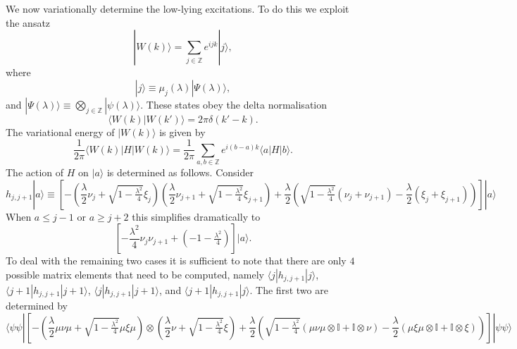 \documentclass[prl,twocolumn,lengthcheck,superscriptaddress]{revtex4-1}
\theoremstyle{definition}
\theoremstyle{remark}
\begin{document}
We now variationally determine the low-lying excitations. To do this we exploit the ansatz
\begin{equation}
	|W(k)\rangle = \sum_{j\in\mathbb{Z}} e^{ijk} |j\rangle,
\end{equation}
where
\begin{equation}
	|j\rangle \equiv \mu_j(\lambda) |\Psi(\lambda)\rangle,
\end{equation}
and $|\Psi(\lambda)\rangle \equiv \bigotimes_{j\in\mathbb{Z}} |\psi(\lambda)\rangle$.  These states obey the delta normalisation
\begin{equation}
	\langle W(k)|W(k')\rangle = 2\pi\delta(k'-k).
\end{equation}
The variational energy of $|W(k)\rangle$ is given by
\begin{equation}
	\frac{1}{2\pi}\langle W(k)|H|W(k)\rangle = \frac{1}{2\pi}\sum_{a,b\in\mathbb{Z}} e^{i(b-a)k} \langle a| H|b\rangle.
\end{equation}
The action of $H$ on $|a\rangle$ is determined as follows. Consider
\begin{equation}
	h_{j,j+1}|a\rangle \equiv \left[-\left(\frac{\lambda}{2}\nu_j +  \sqrt{1-\tfrac{\lambda^2}{4}}\xi_j\right)\left(\frac{\lambda}{2}\nu_{j+1} +  \sqrt{1-\tfrac{\lambda^2}{4}}\xi_{j+1}\right) + \frac{\lambda}{2}\left( \sqrt{1-\tfrac{\lambda^2}{4}}(\nu_j+\nu_{j+1}) -  \frac{\lambda}{2}( \xi_j+\xi_{j+1})\right)\right] |a\rangle
\end{equation}
When $a \le j-1$ or $a\ge j+2$ this simplifies dramatically to
\begin{equation}
	\left[-\frac{\lambda^2}{4}\nu_j\nu_{j+1} + \left(-1-\tfrac{\lambda^2}{4}\right)\right] |a\rangle.
\end{equation}
To deal with the remaining two cases it is sufficient to note that there are only $4$ possible matrix elements that need to be computed, namely $\langle j|h_{j,j+1}|j\rangle$, $\langle j+1|h_{j,j+1}|j+1\rangle$, $\langle j|h_{j,j+1}|j+1\rangle$, and $\langle j+1|h_{j,j+1}|j\rangle$. The first two are determined by
\begin{equation}
	\langle \psi\psi|\left[-\left(\frac{\lambda}{2}\mu\nu\mu +  \sqrt{1-\tfrac{\lambda^2}{4}}\mu\xi\mu\right)\otimes\left(\frac{\lambda}{2}\nu +  \sqrt{1-\tfrac{\lambda^2}{4}}\xi\right) + \frac{\lambda}{2}\left( \sqrt{1-\tfrac{\lambda^2}{4}}(\mu\nu\mu\otimes \mathbb{I}+\mathbb{I}\otimes\nu) -  \frac{\lambda}{2}( \mu\xi\mu\otimes \mathbb{I}+\mathbb{I}\otimes\xi)\right)\right]|\psi\psi\rangle
\end{equation}
\end{document}
